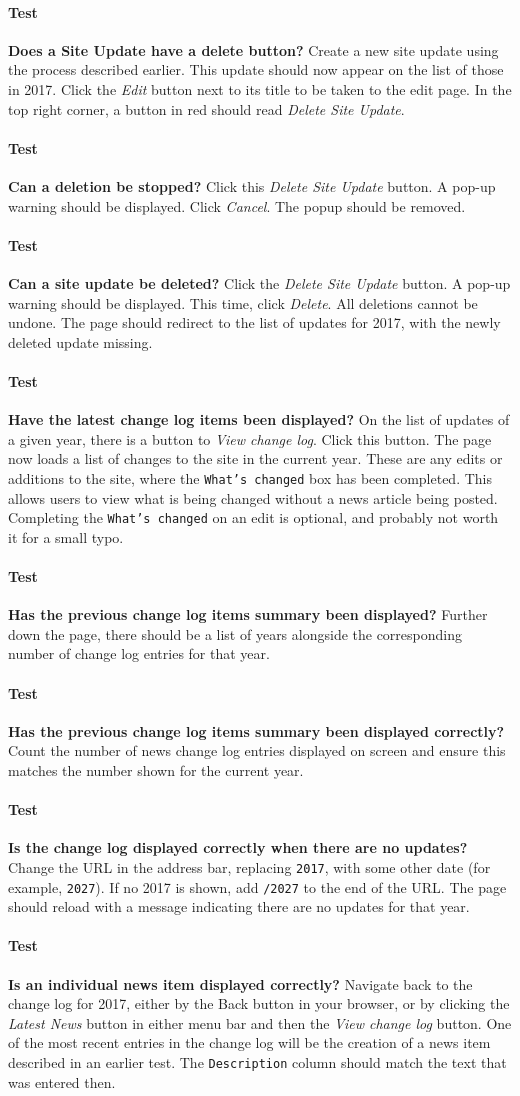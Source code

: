 \documentclass[12pt]{article}
\newcounter{Test}
\newcommand{\test}[1]{%
\stepcounter{Test}%
\paragraph{Test \theTest} \textbf{#1} }
\begin{document}
\test{Does a Site Update have a delete button?}
Create a new site update using the process described earlier. This update should now appear on the list of those in 2017. Click the \textit{Edit} button next to its title to be taken to the edit page. In the top right corner, a button in red should read \textit{Delete Site Update}.

\test{Can a deletion be stopped?}
Click this \textit{Delete Site Update} button. A pop-up warning should be displayed. Click \textit{Cancel}. The popup should be removed.

\test{Can a site update be deleted?}
Click the \textit{Delete Site Update} button. A pop-up warning should be displayed. This time, click \textit{Delete}. All deletions cannot be undone. The page should redirect to the list of updates for 2017, with the newly deleted update missing.

\test{Have the latest change log items been displayed?}
On the list of updates of a given year, there is a button to \textit{View change log}. Click this button. The page now loads a list of changes to the site in the current year. These are any edits or additions to the site, where the \texttt{What's changed} box has been completed. This allows users to view what is being changed without a news article being posted. Completing the \texttt{What's changed} on an edit is optional, and probably not worth it for a small typo.

\test{Has the previous change log items summary been displayed?}
Further down the page, there should be a list of years alongside the corresponding number of change log entries for that year.

\test{Has the previous change log items summary been displayed correctly?}
Count the number of news change log entries displayed on screen and ensure this matches the number shown for the current year.

\test{Is the change log displayed correctly when there are no updates?}
Change the URL in the address bar, replacing \texttt{2017}, with some other date (for example, \texttt{2027}). If no 2017 is shown, add \texttt{/2027} to the end of the URL. The page should reload with a message indicating there are no updates for that year.

\test{Is an individual news item displayed correctly?}
Navigate back to the change log for 2017, either by the Back button in your browser, or by clicking the \textit{Latest News} button in either menu bar and then the \textit{View change log} button. One of the most recent entries in the change log will be the creation of a news item described in an earlier test. The \texttt{Description} column should match the text that was entered then.
\end{document}
